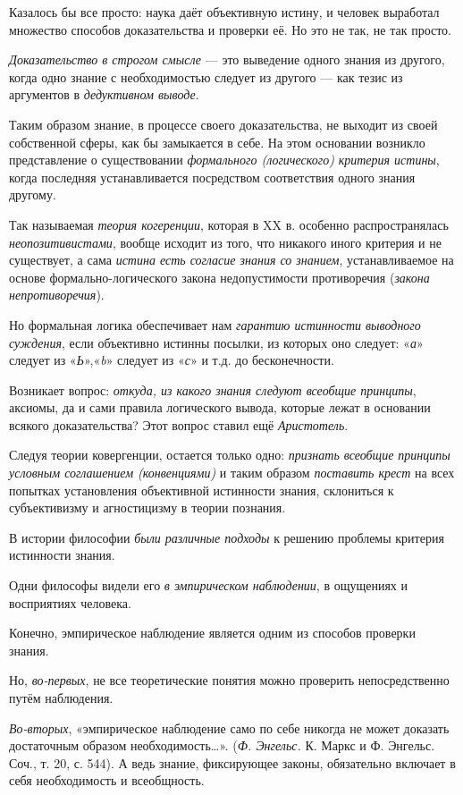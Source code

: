 \documentclass[a4paper,14pt,russian]{extreport}
\begin{document}
Казалось бы все просто: наука даёт объективную истину, и человек выработал множество способов доказательства и проверки её. Но это не так, не так просто.

\emph{Доказательство в строгом смысле} --- это выведение одного знания из другого, когда одно знание с необходимостью следует из другого --- как тезис из аргументов в \emph{дедуктивном выводе}.

Таким образом знание, в процессе своего доказательства, не выходит из своей собственной сферы, как бы замыкается в себе. На этом основании возникло представление о существовании \emph{формального (логического)} \emph{критерия истины}, когда последняя устанавливается посредством соответствия одного знания другому.

Так называемая \emph{теория когеренции}, которая в XX в. особенно распространялась \emph{неопозитивистами}, вообще исходит из того, что никакого иного критерия и не существует, а сама \emph{истина есть согласие знания со знанием}, устанавливаемое на основе формально-логического закона недопустимости противоречия (\emph{закона непротиворечия}).

Но формальная логика обеспечивает нам \emph{гарантию истинности выводного суждения}, если объективно истинны посылки, из которых оно следует: «\emph{а}» следует из «\emph{Ь}»,«\emph{b}» следует из «\emph{с}» и т.д. до бесконечности.

Возникает вопрос: \emph{откуда, из какого знания следуют всеобщие принципы}, аксиомы, да и сами правила логического вывода, которые лежат в основании всякого доказательства? Этот вопрос ставил ещё \emph{Аристотель}.

Следуя теории ковергенции, остается только одно: \emph{признать всеобщие принципы условным соглашением (конвенциями)} и таким образом \emph{поставить крест} на всех попытках установления объективной истинности знания, склониться к субъективизму и агностицизму в теории познания.

В истории философии \emph{были различные подходы} к решению проблемы критерия истинности знания.

Одни философы видели его \emph{в эмпирическом наблюдении}, в ощущениях и восприятиях человека.

Конечно, эмпирическое наблюдение является одним из способов проверки знания.

Но, \emph{во-первых}, не все теоретические понятия можно проверить непосредственно путём наблюдения.

\emph{Во-вторых}, «эмпирическое наблюдение само по себе никогда не может доказать достаточным образом необходимость\ldots». (\emph{Ф. Энгельс.} К. Маркс и Ф. Энгельс. Соч., т. 20, с. 544). А ведь знание, фиксирующее законы, обязательно включает в себя необходимость и всеобщность.
\end{document}
